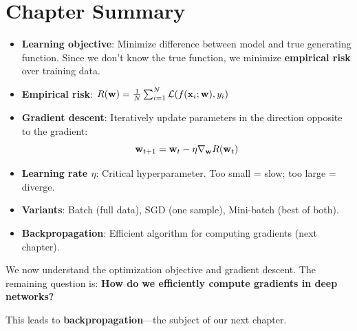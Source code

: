 
\section{Chapter Summary}

\begin{itemize}
    \item \textbf{Learning objective}: Minimize difference between model and true generating function. Since we don't know the true function, we minimize \textbf{empirical risk} over training data.
    
    \item \textbf{Empirical risk}: $R(\mathbf{w}) = \frac{1}{N} \sum_{i=1}^{N} \mathcal{L}(f(\mathbf{x}_i; \mathbf{w}), y_i)$
    
    \item \textbf{Gradient descent}: Iteratively update parameters in the direction opposite to the gradient:
    \[
    \mathbf{w}_{t+1} = \mathbf{w}_t - \eta \nabla_{\mathbf{w}} R(\mathbf{w}_t)
    \]
    
    \item \textbf{Learning rate $\eta$}: Critical hyperparameter. Too small = slow; too large = diverge.
    
    \item \textbf{Variants}: Batch (full data), SGD (one sample), Mini-batch (best of both).
    
    \item \textbf{Backpropagation}: Efficient algorithm for computing gradients (next chapter).
\end{itemize}

\begin{bluebox}
We now understand the optimization objective and gradient descent. The remaining question is: \textbf{How do we efficiently compute gradients in deep networks?}

This leads to \textbf{backpropagation}---the subject of our next chapter.
\end{bluebox}
